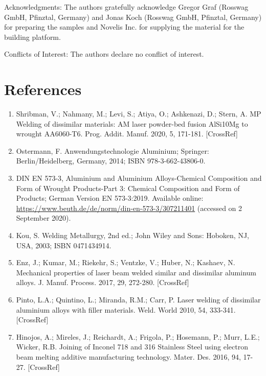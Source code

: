 \documentclass[10pt]{article}
\begin{document}
Acknowledgments: The authors gratefully acknowledge Gregor Graf (Rosswag GmbH, Pfinztal, Germany) and Jonas Koch (Rosswag GmbH, Pfinztal, Germany) for preparing the samples and Novelis Inc. for supplying the material for the building platform.

Conflicts of Interest: The authors declare no conflict of interest.

\section*{References}
\begin{enumerate}
  \item Shribman, V.; Nahmany, M.; Levi, S.; Atiya, O.; Ashkenazi, D.; Stern, A. MP Welding of dissimilar materials: AM laser powder-bed fusion AlSi10Mg to wrought AA6060-T6. Prog. Addit. Manuf. 2020, 5, 171-181. [CrossRef]

  \item Ostermann, F. Anwendungstechnologie Aluminium; Springer: Berlin/Heidelberg, Germany, 2014; ISBN 978-3-662-43806-0.

  \item DIN EN 573-3, Aluminium and Aluminium Alloys-Chemical Composition and Form of Wrought Products-Part 3: Chemical Composition and Form of Products; German Version EN 573-3:2019. Available online: \href{https://www.beuth.de/de/norm/din-en-573-3/307211401}{https://www.beuth.de/de/norm/din-en-573-3/307211401} (accessed on 2 September 2020).

  \item Kou, S. Welding Metallurgy, 2nd ed.; John Wiley and Sons: Hoboken, NJ, USA, 2003; ISBN 0471434914.

  \item Enz, J.; Kumar, M.; Riekehr, S.; Ventzke, V.; Huber, N.; Kashaev, N. Mechanical properties of laser beam welded similar and dissimilar aluminum alloys. J. Manuf. Process. 2017, 29, 272-280. [CrossRef]

  \item Pinto, L.A.; Quintino, L.; Miranda, R.M.; Carr, P. Laser welding of dissimilar aluminium alloys with filler materials. Weld. World 2010, 54, 333-341. [CrossRef]

  \item Hinojos, A.; Mireles, J.; Reichardt, A.; Frigola, P.; Hosemann, P.; Murr, L.E.; Wicker, R.B. Joining of Inconel 718 and 316 Stainless Steel using electron beam melting additive manufacturing technology. Mater. Des. 2016, 94, 17-27. [CrossRef]


\end{enumerate}
\end{document}
